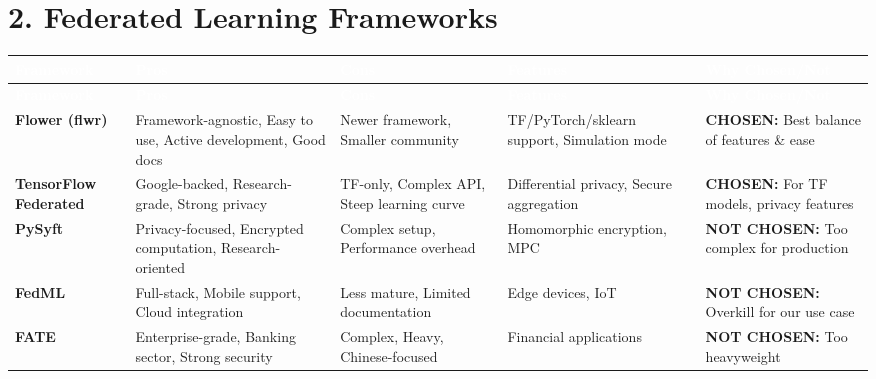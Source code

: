 \documentclass[12pt,a4paper,landscape]{article}
\begin{document}
\section*{2. Federated Learning Frameworks}

\begin{longtable}{|p{2.5cm}|p{3cm}|p{3cm}|p{3cm}|p{4cm}|}
\hline
\rowcolor{headercolor}
\textcolor{white}{\textbf{Framework}} & 
\textcolor{white}{\textbf{Pros}} & 
\textcolor{white}{\textbf{Cons}} & 
\textcolor{white}{\textbf{Features}} & 
\textcolor{white}{\textbf{Why Chosen/Not}} \\
\hline
\endfirsthead

\hline
\rowcolor{headercolor}
\textcolor{white}{\textbf{Framework}} & 
\textcolor{white}{\textbf{Pros}} & 
\textcolor{white}{\textbf{Cons}} & 
\textcolor{white}{\textbf{Features}} & 
\textcolor{white}{\textbf{Why Chosen/Not}} \\
\hline
\endhead

\rowcolor{rowcolor1}
\textbf{Flower (flwr)} & 
Framework-agnostic, Easy to use, Active development, Good docs & 
Newer framework, Smaller community & 
TF/PyTorch/sklearn support, Simulation mode & 
\textbf{CHOSEN:} Best balance of features \& ease \\
\hline

\rowcolor{rowcolor2}
\textbf{TensorFlow Federated} & 
Google-backed, Research-grade, Strong privacy & 
TF-only, Complex API, Steep learning curve & 
Differential privacy, Secure aggregation & 
\textbf{CHOSEN:} For TF models, privacy features \\
\hline

\rowcolor{rowcolor1}
\textbf{PySyft} & 
Privacy-focused, Encrypted computation, Research-oriented & 
Complex setup, Performance overhead & 
Homomorphic encryption, MPC & 
\textbf{NOT CHOSEN:} Too complex for production \\
\hline

\rowcolor{rowcolor2}
\textbf{FedML} & 
Full-stack, Mobile support, Cloud integration & 
Less mature, Limited documentation & 
Edge devices, IoT & 
\textbf{NOT CHOSEN:} Overkill for our use case \\
\hline

\rowcolor{rowcolor1}
\textbf{FATE} & 
Enterprise-grade, Banking sector, Strong security & 
Complex, Heavy, Chinese-focused & 
Financial applications & 
\textbf{NOT CHOSEN:} Too heavyweight \\
\hline
\end{longtable}
\end{document}
